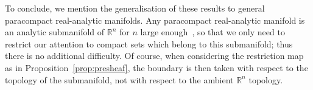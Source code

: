 \documentclass[AHL,Unicode,longabstracts,published]{cedram}
\newcommand\1{\mathds{1}}
\newcommand{\R}{\mathbb{R}}
\begin{document}
To conclude, we mention the generalisation of these results to general paracompact real-analytic manifolds. Any paracompact real-analytic manifold is an analytic submanifold of $\R^n$ for $n$ large enough~\cite{grauert_levis_1958}, so that we only need to restrict our attention to compact sets which belong to this submanifold; thus there is no additional difficulty. Of course, when considering the restriction map as in Proposition~\ref{prop:presheaf}, the boundary is then taken with respect to the topology of the submanifold, not with respect to the ambient $\R^n$ topology.




\end{document}
